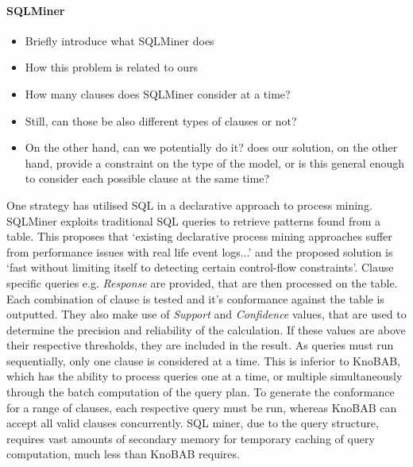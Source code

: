 \paragraph*{SQLMiner} \cite{Schonig15, SchonigRCJM16}
\begin{itemize}
	\item{Briefly introduce what SQLMiner does}
	\item{How this problem is related to ours}
	\item{How many clauses does SQLMiner consider at a time?}
	\item{Still, can those be also different types of clauses or not?}
	\item{On the other hand, can we potentially do it? does our solution, on the other hand, provide a constraint on the type of the model, or is this general enough to consider each possible clause at the same time?}
\end{itemize}
One strategy has utilised SQL in a declarative approach to process mining. SQLMiner \cite{Schonig15} exploits traditional SQL queries to retrieve patterns found from a table. This proposes that `existing declarative process mining approaches suffer from performance issues with real life event logs...' and the proposed solution is `fast without limiting itself to detecting certain control-flow constraints'. Clause specific queries e.g. \emph{Response} are provided, that are then processed on the table. Each combination of clause is tested and it's conformance against the table is outputted. They also make use of \emph{Support} and \emph{Confidence} values, that are used to determine the precision and reliability of the calculation. If these values are above their respective thresholds, they are included in the result. As queries must run sequentially, only one clause is considered at a time. This is inferior to KnoBAB, which has the ability to process queries one at a time, or multiple simultaneously through the batch computation of the query plan. To generate the conformance for a range of clauses, each respective query must be run, whereas KnoBAB can accept all valid clauses concurrently. SQL miner, due to the query structure, requires vast amounts of secondary memory for temporary caching of query computation, much less than KnoBAB requires.
